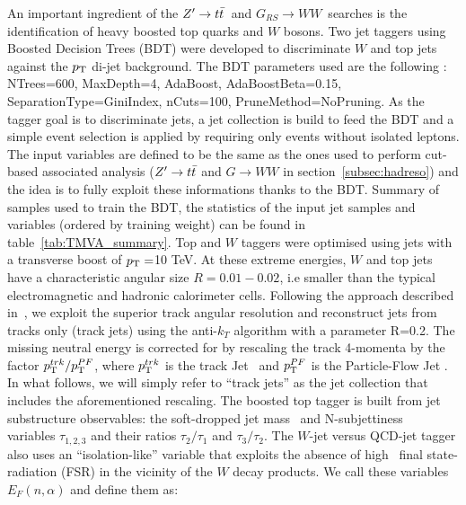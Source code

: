 \documentclass{cernrep}
\newcommand*{\zptt}{\ensuremath{Z^{\prime} \rightarrow \ttbar}}
\newcommand*{\rsg}{\ensuremath{G_{RS} \rightarrow WW}}
\begin{document}
An important ingredient of the \zptt\ and \rsg\ searches is the identification of heavy boosted top quarks and $W$ bosons. Two jet taggers using Boosted Decision Trees (BDT) were developed to discriminate $W$ and top jets against the $p_{\text{T}}$ di-jet background.
\newline
The BDT parameters used are the following : NTrees=600, MaxDepth=4, AdaBoost, AdaBoostBeta=0.15, SeparationType=GiniIndex, nCuts=100, PruneMethod=NoPruning. As the tagger goal is to discriminate jets, a jet collection is build to feed the BDT and a simple event selection is applied by requiring only events without isolated leptons.
The input variables are defined to be the same as the ones used to perform cut-based associated analysis ($Z^{\prime} \rightarrow t\bar{t}$ and $G \rightarrow WW$ in section~\ref{subsec:hadreso}) and the idea is to fully exploit these informations thanks to the BDT. Summary of samples used to train the BDT, the statistics of the input jet samples and variables (ordered by training weight) can be found in table~\ref{tab:TMVA_summary}.
\newline
Top and $W$ taggers were optimised using jets with a transverse boost of $p_{\text{T}}=$10 TeV. At these extreme energies, $W$ and top jets have a characteristic angular size $R=0.01-0.02$, i.e smaller than the typical electromagnetic and hadronic calorimeter cells. Following the approach described in~\cite{Larkoski:2015yqa}, we exploit the superior track angular resolution and reconstruct jets from tracks only (track jets) using the anti-$k_T$ algorithm with a parameter R=0.2. The missing neutral energy is corrected for by rescaling the track 4-momenta by the factor $p_{\text{T}}^{trk}/p_{\text{T}}^{PF}$, where $p_{\text{T}}^{trk}$ is the track Jet \pt\ and $p_{\text{T}}^{PF}$ is the Particle-Flow Jet \pT. In what follows, we will simply refer to ``track jets'' as the jet collection that includes the aforementioned rescaling.
\newline
The boosted top tagger is built from jet substructure observables: the soft-dropped jet mass~\cite{Larkoski:2014wba} and N-subjettiness~\cite{Thaler:2010tr} variables $\tau_{1,2,3}$ and their ratios $\tau_{2}/\tau_{1}$ and $\tau_{3}/\tau_{2}$. The $W$-jet versus QCD-jet tagger also uses an ``isolation-like'' variable that exploits the absence of high \pt\ final state-radiation (FSR) in the vicinity of the $W$ decay products. We call these variables $E_{F}(n,\alpha)$ and define them as:
\end{document}
